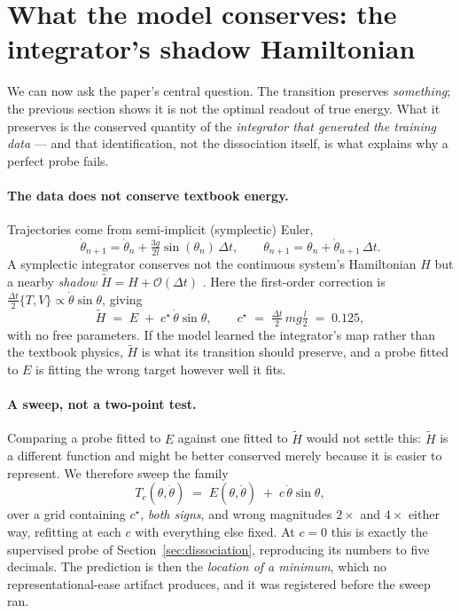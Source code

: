 \section{What the model conserves: the integrator's shadow Hamiltonian}
\label{sec:mechanism}

We can now ask the paper's central question. The transition preserves \emph{something}; the previous
section shows it is not the optimal readout of true energy. What it preserves is the conserved
quantity of the \emph{integrator that generated the training data} --- and that identification, not
the dissociation itself, is what explains why a perfect probe fails.

\paragraph{The data does not conserve textbook energy.}
Trajectories come from semi-implicit (symplectic) Euler,
\begin{equation}
\dot\theta_{n+1} = \dot\theta_n + \tfrac{3g}{2l}\sin(\theta_n)\,\Delta t,
\qquad
\theta_{n+1} = \theta_n + \dot\theta_{n+1}\,\Delta t .
\end{equation}
A symplectic integrator conserves not the continuous system's Hamiltonian $H$ but a nearby
\emph{shadow} $\tilde H = H + \mathcal{O}(\Delta t)$ \citep{hairer2006geometric}. Here the
first-order correction is $\tfrac{\Delta t}{2}\{T,V\} \propto \dot\theta\sin\theta$, giving
\begin{equation}
\tilde H \;=\; E \;+\; c^\star\,\dot\theta\sin\theta,
\qquad
c^\star \;=\; \tfrac{\Delta t}{2}\,mg\tfrac{l}{2} \;=\; 0.125 ,
\label{eq:shadow}
\end{equation}
with no free parameters. If the model learned the integrator's map rather than the textbook physics,
$\tilde H$ is what its transition should preserve, and a probe fitted to $E$ is fitting the wrong
target however well it fits.

\paragraph{A sweep, not a two-point test.}
Comparing a probe fitted to $E$ against one fitted to $\tilde H$ would not settle this: $\tilde H$ is
a different function and might be better conserved merely because it is easier to represent. We
therefore sweep the family
\begin{equation}
T_c(\theta,\dot\theta) \;=\; E(\theta,\dot\theta) \;+\; c\,\dot\theta\sin\theta ,
\end{equation}
over a grid containing $c^\star$, \emph{both signs}, and wrong magnitudes $2\times$ and $4\times$
either way, refitting at each $c$ with everything else fixed. At $c=0$ this is exactly the supervised
probe of Section~\ref{sec:dissociation}, reproducing its numbers to five decimals. The prediction is
then the \emph{location of a minimum}, which no representational-ease artifact produces, and it was
registered before the sweep ran.


